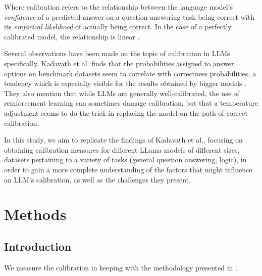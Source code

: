 \documentclass[11pt]{article}
\begin{document}
Where calibration refers to the relationship between 
the language model's \emph{confidence} of a predicted answer 
on a question-answering task being correct with 
its  \emph{empirical likelihood} of actually being  
correct. In the case of a perfectly calibrated model, the relationship is linear \cite{spiess2024quality}. 

Several observations have been made on the topic of calibration in LLMs specifically. Kadavath et al. finds that the probabilities assigned to answer options on benchmark datasets seem to correlate with correctness probabilities, a tendency which is especially visible for the results obtained by bigger models \cite{kadavath2022language}. They also mention that while LLMs are generally well-calibrated, the use of reinforcement learning can sometimes damage calibration, but that a temperature adjustment seems to do the trick in replacing the model on the path of correct calibration.

In this study, we aim to replicate the findings of Kadavath et al., focusing on obtaining calibration measures for different LLama models \cite{touvron2023llama} of different sizes, datasets pertaining to a variety of tasks (general question answering, logic), in order to gain a more complete understanding of the factors that might influence an LLM's calibration, as well as the challenges they present.



\section{Methods}


\subsection{Introduction}

We measure the calibration in keeping with the methodology 
presented in \cite{kadavath2022language}. 
\end{document}
